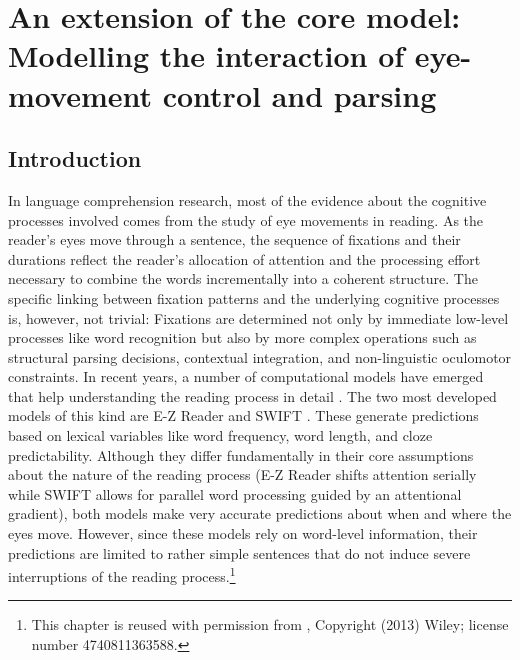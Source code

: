 \chapter[Extension: Eye-movement control and parsing]{An extension of the core model: 
Modelling the interaction of eye-movement control and parsing} \label{c02emma}

\section{Introduction}
In language comprehension research, most of the evidence about the cognitive processes involved comes from the study of eye movements in reading.  As the reader's eyes move through a sentence, the  sequence of fixations and their durations reflect the reader's allocation of attention and the processing effort necessary to combine the words incrementally into a coherent structure.  The specific linking between fixation patterns and the underlying cognitive processes is, however, not trivial: Fixations are determined not only by immediate low-level processes like word recognition but also by more complex operations such as structural parsing decisions, contextual integration, and non-linguistic oculomotor constraints.  In recent years, a number of computational models have emerged that help understanding the reading process in detail \citep{BicknellLevy2010a,EngbertEtAl2002,Engbert2005,Legge2002,Reichle1998,Nilsson2010,Reichle2006,Reilly2006}.  
The two most developed models of this kind are  E-Z Reader \citep{Reichle2006} and  SWIFT \citep{Engbert2005}.  These generate predictions based on  lexical variables like word frequency, word length, and cloze predictability.  Although they differ fundamentally in their core assumptions about the nature of the reading process (E-Z Reader shifts attention  serially while SWIFT allows for  parallel word processing guided by an attentional gradient), both models make very accurate predictions about when and where the eyes move.  However, since these models rely on word-level information, their predictions are limited to rather simple sentences that do not induce severe interruptions of the reading process.\footnote{This chapter is reused  with permission from \cite{Engelmanna}, Copyright (2013) Wiley; license number 4740811363588.}

